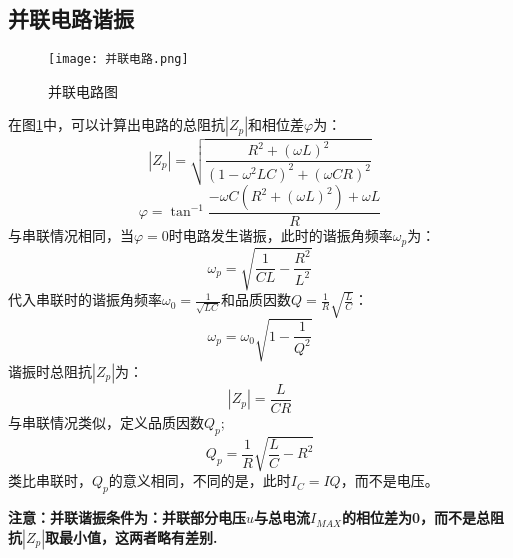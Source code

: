 \documentclass[11pt]{article}
\begin{document}
\subsection{并联电路谐振}
\begin{figure}[h]
	\centering
	\texttt{[image: 并联电路.png]}
	\caption{并联电路图}
	\label{fig:parallel circuit}
\end{figure}
在图\ref{fig:parallel circuit}中，可以计算出电路的总阻抗\(\left|Z_p\right|\)和相位差$\varphi$为：
\begin{equation}
	\left|Z_p\right|=\sqrt{\frac{R^2+(\omega L)^2}{(1-\omega^2 LC)^2+(\omega CR)^2}}
\end{equation}
\begin{equation}
	\varphi=\tan^{-1} \frac{-\omega C(R^2+(\omega L)^2)+\omega L}{R}
\end{equation}
与串联情况相同，当$\varphi=0$时电路发生谐振，此时的谐振角频率\(\omega_p\)为：
\begin{equation}
	 \omega_p=\sqrt{\frac{1}{CL}-\frac{R^2}{L^2}}
\end{equation}
代入串联时的谐振角频率\(\omega_0=\frac{1}{\sqrt{LC}}\)和品质因数\(Q=\frac{1}{R}\sqrt{\frac{L}{C}}\)：
\begin{equation}
	\omega_p=\omega_0 \sqrt{1-\frac{1}{Q^2}}
\end{equation}
谐振时总阻抗\(\left|Z_p\right|\)为：
\begin{equation}
	\left|Z_p\right|=\frac{L}{CR}
\end{equation}
与串联情况类似，定义品质因数\(Q_p\);
\begin{equation}
	Q_p=\frac{1}{R} \sqrt{\frac{L}{C}-R^2}
\end{equation}
类比串联时，\(Q_p\)的意义相同，不同的是，此时\(I_C=IQ\)，而不是电压。

\textbf{注意：并联谐振条件为：并联部分电压$u$与总电流$I_{MAX}$的相位差为0，而不是总阻抗\(\left|Z_p\right|\)取最小值，这两者略有差别.}
\end{document}
